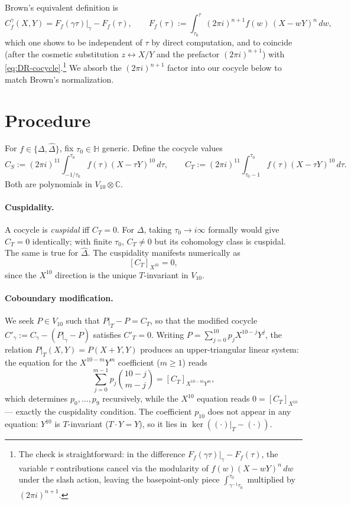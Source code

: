 \documentclass[11pt,letterpaper]{article}
\newcommand{\HH}{\mathbb{H}}
\newcommand{\CC}{\mathbb{C}}
\newcommand{\Dhat}{\widehat{\Delta}}
\begin{document}
Brown's equivalent definition \cite[Def.\ 2.4, eq.\ (2.12)]{Brown2017} is
\begin{equation}\label{eq:Brown-cocycle}
  C_f^\gamma(X,Y) = F_f(\gamma\tau)\big|_\gamma - F_f(\tau), \qquad
  F_f(\tau) := \int_{\tau_0}^\tau (2\pi i)^{n+1} f(w)\,(X - w Y)^n\, dw,
\end{equation}
which one shows to be independent of $\tau$ by direct computation, and to coincide (after the cosmetic substitution $z \leftrightarrow X/Y$ and the prefactor $(2\pi i)^{n+1}$) with \eqref{eq:DR-cocycle}.\footnote{The check is straightforward: in the difference $F_f(\gamma\tau)|_\gamma - F_f(\tau)$, the variable $\tau$ contributions cancel via the modularity of $f(w)(X-wY)^n\,dw$ under the slash action, leaving the basepoint-only piece $\int_{\gamma^{-1}\tau_0}^{\tau_0}$ multiplied by $(2\pi i)^{n+1}$.} We absorb the $(2\pi i)^{n+1}$ factor into our cocycle below to match Brown's normalization.

\section{Procedure}\label{sec:procedure}

For $f \in \{\Delta, \Dhat\}$, fix $\tau_0 \in \HH$ generic. Define the cocycle values
\[
  C_S := (2\pi i)^{11} \int_{-1/\tau_0}^{\tau_0} f(\tau)(X-\tau Y)^{10}\, d\tau, \qquad
  C_T := (2\pi i)^{11} \int_{\tau_0 - 1}^{\tau_0} f(\tau)(X-\tau Y)^{10}\, d\tau.
\]
Both are polynomials in $V_{10} \otimes \CC$.

\paragraph{Cuspidality.} A cocycle is \emph{cuspidal} iff $C_T = 0$. For $\Delta$, taking $\tau_0 \to i\infty$ formally would give $C_T = 0$ identically; with finite $\tau_0$, $C_T \ne 0$ but its cohomology class is cuspidal. The same is true for $\Dhat$. The cuspidality manifests numerically as
\[
  [C_T]_{X^{10}} = 0,
\]
since the $X^{10}$ direction is the unique $T$-invariant in $V_{10}$.

\paragraph{Coboundary modification.} We seek $P \in V_{10}$ such that $P\big|_T - P = C_T$, so that the modified cocycle $C'_\gamma := C_\gamma - (P\big|_\gamma - P)$ satisfies $C'_T = 0$. Writing $P = \sum_{j=0}^{10} p_j X^{10-j} Y^j$, the relation $P|_T(X,Y) = P(X+Y, Y)$ produces an upper-triangular linear system: the equation for the $X^{10-m}Y^m$ coefficient ($m \ge 1$) reads
\[
  \sum_{j=0}^{m-1} p_j \binom{10-j}{m-j} = [C_T]_{X^{10-m}Y^m},
\]
which determines $p_0, \ldots, p_9$ recursively, while the $X^{10}$ equation reads $0 = [C_T]_{X^{10}}$ — exactly the cuspidality condition. The coefficient $p_{10}$ does not appear in any equation: $Y^{10}$ is $T$-invariant ($T \cdot Y = Y$), so it lies in $\ker((\cdot)\big|_T - (\cdot))$.
\end{document}

